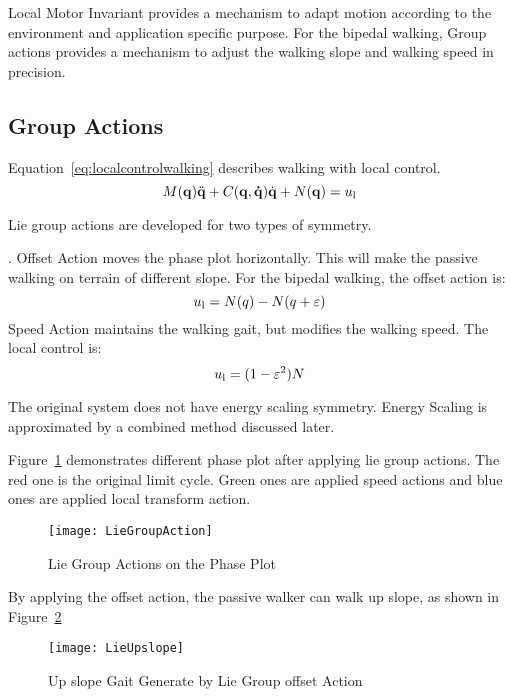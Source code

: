 Local Motor Invariant provides a mechanism to adapt motion according to the environment and application specific purpose. 
For the bipedal walking, Group actions provides a mechanism to adjust the walking slope and walking speed in precision.




\subsection{Group Actions}

Equation~\ref{eq:localcontrolwalking} describes walking with local control.
\begin{equation}
\label{eq:localcontrolwalking}
M(\mathbf{q}) \ddot{\mathbf{q}} + C(\mathbf{q,\dot{q}})\dot{\mathbf{q}} + N(\mathbf{q}) = u_{\mathrm{l}}
\end{equation}




Lie group actions are developed for two types of symmetry.
\begin{itemize}

.
Offset Action moves the phase plot horizontally.
This will make the passive walking on terrain of different slope.
For the bipedal walking, the offset action is:
\[
u_{\mathrm{l}}=N(q)-N(q+\varepsilon)
\]
Speed Action maintains the walking gait, but modifies the walking speed.
The local control is:
\[  
u_{\mathrm{l}}=(1-\varepsilon^2)N
\]
\end{itemize}

The original system does not have energy scaling symmetry.
Energy Scaling is approximated by a combined method discussed later.

Figure~\ref{fig:walkliegroupphase} demonstrates different phase plot after applying lie group actions.
The red one is the original limit cycle.
Green ones are applied speed actions and blue ones are applied local transform action.


\begin{figure}[!htbp]
  \begin{center}
     \texttt{[image: LieGroupAction]}
    \caption{Lie Group Actions on the Phase Plot}
    \label{fig:walkliegroupphase}
\end{center}
\end{figure}


By applying the offset action,   the passive walker can walk up slope, as shown in Figure~\ref{fig:liegroupupslope}
\begin{figure}[!htbp]
  \begin{center}
      \texttt{[image: LieUpslope]}
    \caption{Up slope Gait Generate by Lie Group offset Action}
    \label{fig:liegroupupslope}
\end{center}
\end{figure}

